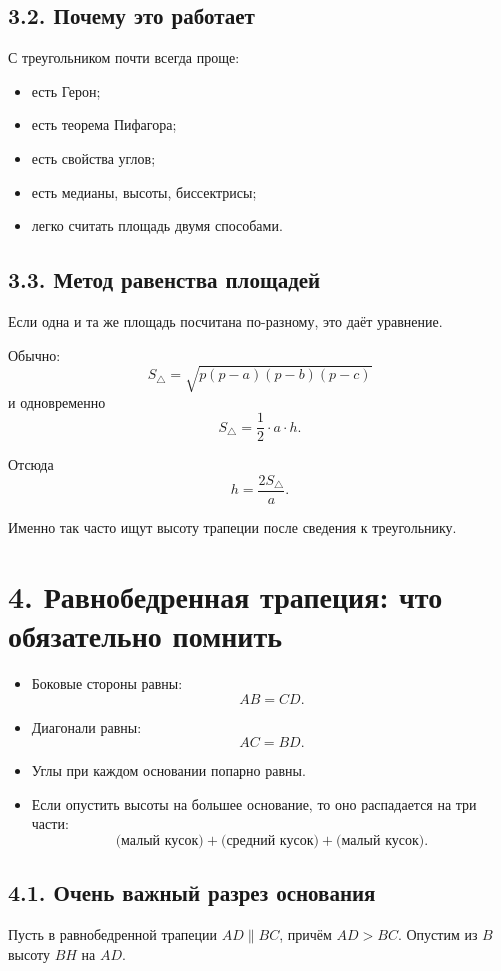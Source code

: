 \documentclass[a4paper,12pt]{article}
\newcommand{\Area}{S}
\begin{document}
\subsection*{\textcolor{accent}{3.2. Почему это работает}}
С треугольником почти всегда проще:
\begin{itemize}
    \item есть Герон;
    \item есть теорема Пифагора;
    \item есть свойства углов;
    \item есть медианы, высоты, биссектрисы;
    \item легко считать площадь двумя способами.
\end{itemize}

\subsection*{\textcolor{accent}{3.3. Метод равенства площадей}}
Если одна и та же площадь посчитана по-разному, это даёт уравнение.

Обычно:
\[
\Area_{\triangle}=\sqrt{p(p-a)(p-b)(p-c)}
\]
и одновременно
\[
\Area_{\triangle}=\frac12 \cdot a \cdot h.
\]

Отсюда
\[
h=\frac{2\Area_{\triangle}}{a}.
\]

Именно так часто ищут высоту трапеции после сведения к треугольнику.

\section*{\textcolor{darkaccent}{4. Равнобедренная трапеция: что обязательно помнить}}

\begin{itemize}
    \item Боковые стороны равны:
    \[
    AB=CD.
    \]
    \item Диагонали равны:
    \[
    AC=BD.
    \]
    \item Углы при каждом основании попарно равны.
    \item Если опустить высоты на большее основание, то оно распадается на три части:
    \[
    \text{(малый кусок)}+\text{(средний кусок)}+\text{(малый кусок)}.
    \]
\end{itemize}

\subsection*{\textcolor{accent}{4.1. Очень важный разрез основания}}
Пусть в равнобедренной трапеции $AD \parallel BC$, причём $AD>BC$. Опустим из $B$ высоту $BH$ на $AD$.
\end{document}
